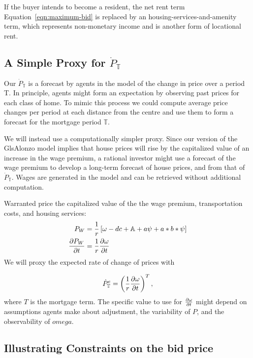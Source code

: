 {If the buyer intends to become a resident, the net rent term Equation~\ref{eqn:maximum-bid} is replaced by an housing-services-and-amenity term, which represents non-monetary income and is another form of locational rent. 

\subsection{A Simple Proxy for $\dot P_\mathbb{T}$}

Our $\dot P_\mathbb{T}$ is a forecast by agents in the model of the change in price over a period T. In principle, agents might form an expectation by observing past prices for each class of home. To mimic this process we could compute average price changes per period at each distance from the centre and use them to form a forecast for the mortgage period $\mathbb{T}$. 

We will instead use a computationally simpler proxy. Since our version of the Gls{Alonzo model} implies that house prices will rise by the capitalized value of an increase in the wage premium, a rational investor might use a forecast of the wage premium to develop a long-term forecast of house prices, and from that of $\dot P_\mathbb{T}$. Wages are generated in the model and can be retrieved without additional computation. 

Warranted price the capitalized value of the the wage premium, transportation costs, and housing services:
\begin{align}
P_W &=\frac{1}{r}\left[\omega - {dc} + \mathbb{A} + a\psi\nonumber  + a*b*\psi\right] \nonumber\\
\frac{\partial P_W}{\partial t} &= \frac{1}{r}\frac{\partial \omega}{\partial t} \nonumber \\
\end{align}
We will  proxy the expected rate of change of prices with

\begin{align}
\dot P^e_\mathbb{T} &= \left(\frac{1}{r}\frac{\partial \omega}{\partial t} \right)^T, \nonumber \\
\end{align}
where $T$ is the mortgage term. The specific value to use for $\frac{\partial \omega}{\partial t}$ might depend on assumptions agents make about adjustment,  the variability of $P$, and the observability of $omega$.


\subsection{Illustrating  Constraints on the bid price}
 
}
